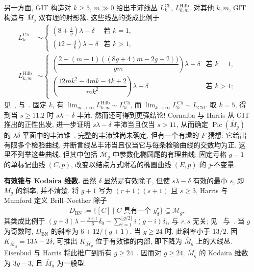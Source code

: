 另一方面, GIT 构造对 $k\geq5$, $m\gg0$ 给出丰沛线丛 $L_k^{\mathrm{Ch}}$, $L_{k,\allowbreak m}^{\mathrm{Hilb}}$. 对其他 $k,\allowbreak m$, GIT 构造与 $\overline M_g$ 双有理的射影簇. 这些线丛的类成比例于
\[
\begin{aligned}
L_k^{\mathrm{Ch}}&\sim\begin{cases}(8+\frac4g)\lambda-\delta&\text{若 }k=1,\\(12-\frac4k)\lambda-\delta&\text{若 }k>1,\end{cases}\\
L_{k,m}^{\mathrm{Hilb}}&\sim\begin{cases}
\left(\dfrac{2+(m-1)((8g+4)m-2g+2))}{gm}\right)\lambda-\delta&\text{若 }k=1,\\
\left(\dfrac{12mk^2-4mk-4k+2}{mk^2}\right)\lambda-\delta&\text{若 }k>1;
\end{cases}
\end{aligned}
\]
见~\cite[定理 5.15]{Mum77}, \cite[第 2 节]{CH88} 与~\cite[第 1.5 节]{Vie89}. 固定 $k$, 有 $\lim_{m\to\infty}L_{k,\allowbreak m}^{\mathrm{Hilb}}\sim L_k^{\mathrm{Ch}}$, 而 $\lim_{k\to\infty}L_k^{\mathrm{Ch}}\sim L_{\mathrm{CM}}$. 取 $k=5$, 得到当 $s\geq11.2$ 时 $s\lambda-\delta$ 丰沛. 然而还可得到更强结论! Cornalba 与 Harris 从 GIT 推出的正性出发, 进一步证明 $s\lambda-\delta$ 丰沛当且仅当 $s>11$, 从而确定 $\operatorname{Pic}(\overline M_g)$ 的 $\lambda\delta$ 平面中的丰沛锥~\cite{CH88}. 完整的丰沛锥尚未确定, 但有一个有趣的 $F$-猜想: 它给出有限多个检验曲线, 并断言线丛丰沛当且仅当它与每条检验曲线的交数均为正. 这里不列举这些曲线, 但其中包括 $\overline{\mathcal M}_g$ 中参数化椭圆尾的有理曲线: 固定亏格 $g-1$ 的单标记曲线 $(C,\allowbreak p)$, 改变以结点方式附着的椭圆曲线 $(E,\allowbreak p)$ 的 $j$-不变量.

\noindent\textbf{有效锥与 Kodaira 维数.} 虽然 $\delta$ 显然是有效除子, 但使 $s\lambda-\delta$ 有效的最小 $s$, 即 $\overline M_g$ 的斜率, 并不清楚. 将 $g+1$ 写为 $(r+1)(s+1)$ 且 $s\geq3$, Harris 与 Mumford 定义 Brill--Noether 除子
\[
D_{\mathrm{BN}}:=\overline{\{[C]\mid C\text{ 具有一个 }g_d^r\}}\subseteq\overline{\mathcal M}_g,
\]
其类成比例于 $(g+3)\lambda-\frac{g+1}{6}\delta_0-\sum_{i=1}^{\lfloor g/2\rfloor}i(g-i)\delta_i$, 与 $r,\allowbreak s$ 无关; 见~\cite{HM82} 与~\cite[第 6.F 节]{HM98}. 当 $g$ 为奇数时, $D_{\mathrm{BN}}$ 的斜率为 $6+12/(g+1)$. 当 $g\geq24$ 时, 此斜率小于 $13/2$. 因 $K_{\overline{\mathcal M}_g}=13\lambda-2\delta$, 可推出 $K_{\overline{\mathcal M}_g}$ 位于有效锥的内部, 即下降为 $\overline M_g$ 上的大线丛. Eisenbud 与 Harris 将此推广到所有 $g\geq24$~\cite{EH87}. 因而对 $g\geq24$, $\overline M_g$ 的 Kodaira 维数为 $3g-3$, 且 $\overline M_g$ 为一般型.

